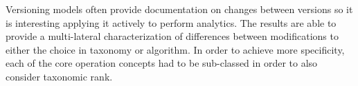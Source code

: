 Versioning models often provide documentation on changes between versions so it is interesting applying it actively to perform analytics.
The results are able to provide a multi-lateral characterization of differences between modifications to either the choice in taxonomy or algorithm.
In order to achieve more specificity, each of the core operation concepts had to be sub-classed in order to also consider taxonomic rank.